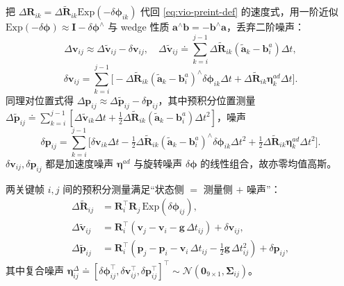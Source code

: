 \begin{derivation}[速度与位置增量的噪声分离]
把 $\Delta\mathbf{R}_{ik}=\Delta\tilde{\mathbf{R}}_{ik}\mathrm{Exp}(-\delta\boldsymbol{\phi}_{ik})$ 代回 \cref{eq:vio-preint-def} 的速度式，用一阶近似 $\mathrm{Exp}(-\delta\boldsymbol{\phi})\approx\mathbf{I}-\delta\boldsymbol{\phi}^\wedge$ 与 wedge 性质 $\mathbf{a}^\wedge\mathbf{b}=-\mathbf{b}^\wedge\mathbf{a}$，丢弃二阶噪声：
\[
  \Delta\mathbf{v}_{ij}\approx\Delta\tilde{\mathbf{v}}_{ij}-\delta\mathbf{v}_{ij},
  \quad
  \Delta\tilde{\mathbf{v}}_{ij}\doteq\sum_{k=i}^{j-1}\Delta\tilde{\mathbf{R}}_{ik}(\tilde{\mathbf{a}}_k-\mathbf{b}^a_i)\Delta t,
\]
\begin{equation}
  \delta\mathbf{v}_{ij}=\sum_{k=i}^{j-1}\Big[-\Delta\tilde{\mathbf{R}}_{ik}(\tilde{\mathbf{a}}_k-\mathbf{b}^a_i)^\wedge\delta\boldsymbol{\phi}_{ik}\Delta t+\Delta\tilde{\mathbf{R}}_{ik}\boldsymbol{\eta}^{ad}_k\Delta t\Big].
  \label{eq:vio-dv-noise}
\end{equation}
同理对位置式得 $\Delta\mathbf{p}_{ij}\approx\Delta\tilde{\mathbf{p}}_{ij}-\delta\mathbf{p}_{ij}$，其中预积分位置测量 $\Delta\tilde{\mathbf{p}}_{ij}\doteq\sum_{k=i}^{j-1}[\Delta\tilde{\mathbf{v}}_{ik}\Delta t+\tfrac12\Delta\tilde{\mathbf{R}}_{ik}(\tilde{\mathbf{a}}_k-\mathbf{b}^a_i)\Delta t^2]$，噪声
\begin{equation}
  \delta\mathbf{p}_{ij}=\sum_{k=i}^{j-1}\Big[\delta\mathbf{v}_{ik}\Delta t-\tfrac12\Delta\tilde{\mathbf{R}}_{ik}(\tilde{\mathbf{a}}_k-\mathbf{b}^a_i)^\wedge\delta\boldsymbol{\phi}_{ik}\Delta t^2+\tfrac12\Delta\tilde{\mathbf{R}}_{ik}\boldsymbol{\eta}^{ad}_k\Delta t^2\Big].
  \label{eq:vio-dp-noise}
\end{equation}
$\delta\mathbf{v}_{ij},\delta\mathbf{p}_{ij}$ 都是加速度噪声 $\boldsymbol{\eta}^{ad}$ 与旋转噪声 $\delta\boldsymbol{\phi}$ 的线性组合，故亦零均值高斯。
\end{derivation}

\begin{theorem}[预积分测量模型]\label{thm:vio-preint-model}
两关键帧 $i,j$ 间的预积分测量满足“状态侧 $=$ 测量侧 $+$ 噪声”\cite{forster2017preintegration}：
\begin{equation}
\begin{aligned}
  \Delta\tilde{\mathbf{R}}_{ij}&=\mathbf{R}_i^\top\mathbf{R}_j\,\mathrm{Exp}(\delta\boldsymbol{\phi}_{ij}),\\
  \Delta\tilde{\mathbf{v}}_{ij}&=\mathbf{R}_i^\top(\mathbf{v}_j-\mathbf{v}_i-\mathbf{g}\,\Delta t_{ij})+\delta\mathbf{v}_{ij},\\
  \Delta\tilde{\mathbf{p}}_{ij}&=\mathbf{R}_i^\top(\mathbf{p}_j-\mathbf{p}_i-\mathbf{v}_i\,\Delta t_{ij}-\tfrac12\mathbf{g}\,\Delta t_{ij}^2)+\delta\mathbf{p}_{ij},
\end{aligned}
  \label{eq:vio-preint-meas}
\end{equation}
其中复合噪声 $\boldsymbol{\eta}^\Delta_{ij}\doteq[\delta\boldsymbol{\phi}_{ij}^\top,\delta\mathbf{v}_{ij}^\top,\delta\mathbf{p}_{ij}^\top]^\top\sim\mathcal{N}(\mathbf{0}_{9\times1},\boldsymbol{\Sigma}_{ij})$。
\end{theorem}

